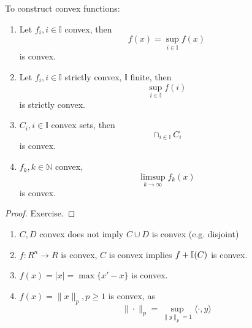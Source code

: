 \begin{proposition}
  To construct convex functions:
  \begin{enumerate}
  \item Let $f_{i}, i \in \mathbb{I}$ convex, then
    \begin{equation}
      \label{eq:15}
      f(x) = \sup_{i \in \mathbb{I}} f(x)
    \end{equation} is convex.
  \item Let $f_{i}, i \in \mathbb{I}$ strictly convex, $\mathbb{I}$
    finite, then
    \begin{equation}
      \label{eq:16}
      \sup_{i \in \mathbb{I}} f(i)
    \end{equation} is strictly convex.
  \item $C_{i}, i \in \mathbb{I}$ convex sets, then
    \begin{equation}
      \label{eq:17}
      \cap_{i \in \mathbb{I}} C_{i}
    \end{equation} is convex.
  \item $f_{k}, k \in \mathbb{N}$ convex,
    \begin{equation}
      \label{eq:18}
      \limsup_{k \rightarrow \infty} f_{k}(x)
    \end{equation} is convex.
  \end{enumerate}
\end{proposition}

\begin{proof}
  Exercise.
\end{proof}

\begin{exmp}
  \label{defn:convexity:5}
  \begin{enumerate}
  \item $C, D$ convex does not imply $C \cup D$ is convex (e.g. disjoint)
  \item $f: R^{n} \rightarrow R$ is convex, $C$ is convex implies $f +
    \I{C}$ is convex.
  \item $f(x) = |x| = \max \{ x' - x \}$ is convex.
  \item $f(x) = \| x \|_{p}, p \geq 1$ is convex, as
    \begin{equation}
      \label{eq:19}
      \| \cdot \|_{p} = \sup_{\| y \|_{p} = 1} \langle \cdot, y \rangle
    \end{equation}
  \end{enumerate}
\end{exmp}

